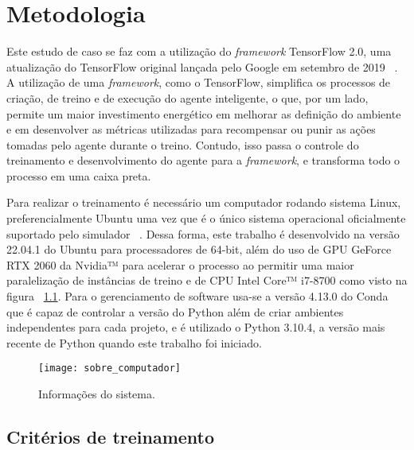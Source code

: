 

\chapter{Metodologia}
\label{cap:metodologia}

Este estudo de caso se faz com a utilização do \emph{framework} TensorFlow 2.0, uma atualização do TensorFlow original lançada pelo Google em setembro de 2019 ~\citep{TensorFlow2-release}. A utilização de uma \emph{framework}, como o TensorFlow, simplifica os processos de criação, de treino e de execução do agente inteligente, o que, por um lado, permite um maior investimento energético em melhorar as definição do ambiente e em desenvolver as métricas utilizadas para recompensar ou punir as ações tomadas pelo agente durante o treino. Contudo, isso passa o controle do treinamento e desenvolvimento do agente para a \emph{framework}, e transforma todo o processo em uma caixa preta.

Para realizar o treinamento é necessário um computador rodando sistema Linux, preferencialmente Ubuntu uma vez que é o único sistema operacional oficialmente suportado pelo simulador ~\citep{Duckietown-requerimentos}. Dessa forma, este trabalho é desenvolvido na versão 22.04.1 do Ubuntu para processadores de 64-bit, além do uso de GPU GeForce RTX 2060 da Nvidia™ para acelerar o processo ao permitir uma maior paralelização de instâncias de treino e de CPU Intel Core™ i7-8700 como visto na figura ~\ref{fig:sobre_computador}. Para o gerenciamento de software usa-se a versão 4.13.0 do Conda ~\citep{Anaconda} que é capaz de controlar a versão do Python além de criar ambientes independentes para cada projeto, e é utilizado o Python 3.10.4, a versão mais recente de Python quando este trabalho foi iniciado.

\begin{figure}
	\centering
	\texttt{[image: sobre\_computador]}
	\caption{Informações do sistema. \label{fig:sobre_computador}}
\end{figure}

\section{Critérios de treinamento}
\label{sec:criterios_de_treinamto}

